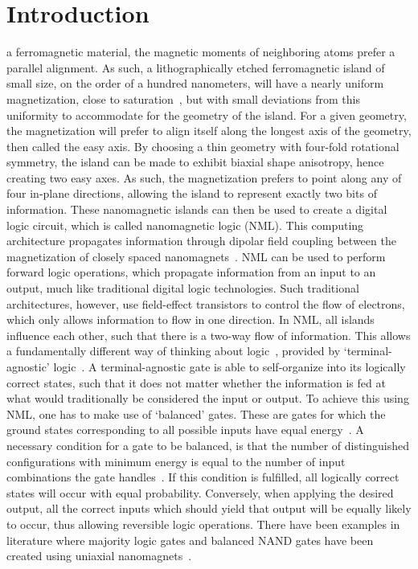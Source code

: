 \documentclass[twocolumn]{phdsymp}
\begin{document}
\section{Introduction}
 a ferromagnetic material, the magnetic moments of neighboring atoms prefer a parallel alignment. As such, a lithographically etched ferromagnetic island of small size, on the order of a hundred nanometers, will have a nearly uniform magnetization, close to saturation~\cite{NML_Carlton,MQCA_RoomTemp,MuMax3_advances}, but with small deviations from this uniformity to accommodate for the geometry of the island. For a given geometry, the magnetization will prefer to align itself along the longest axis of the geometry, then called the easy axis. By choosing a thin geometry with four-fold rotational symmetry, the island can be made to exhibit biaxial shape anisotropy, hence creating two easy axes. As such, the magnetization prefers to point along any of four in-plane directions, allowing the island to represent exactly two bits of information. These nanomagnetic islands can then be used to create a digital logic circuit, which is called nanomagnetic logic (NML). This computing architecture propagates information through dipolar field coupling between the magnetization of closely spaced nanomagnets~\cite{SubnanosecondPropagation_AnisotropyChains}. NML can be used to perform forward logic operations, which propagate information from an input to an output, much like traditional digital logic technologies. Such traditional architectures, however, use field-effect transistors to control the flow of electrons, which only allows information to flow in one direction. In NML, all islands influence each other, such that there is a two-way flow of information. This allows a fundamentally different way of thinking about logic~\cite{gypens2020nanomagnetic}, provided by `terminal-agnostic' logic~\cite{FactorizationMemcomputing}. A terminal-agnostic gate is able to self-organize into its logically correct states, such that it does not matter whether the information is fed at what would traditionally be considered the input or output. To achieve this using NML, one has to make use of `balanced' gates. These are gates for which the ground states corresponding to all possible inputs have equal energy~\cite{GYP-18}. A necessary condition for a gate to be balanced, is that the number of distinguished configurations with minimum energy is equal to the number of input combinations the gate handles~\cite{QCA_Algorithms}. If this condition is fulfilled, all logically correct states will occur with equal probability. Conversely, when applying the desired output, all the correct inputs which should yield that output will be equally likely to occur, thus allowing reversible logic operations. There have been examples in literature where majority logic gates and balanced NAND gates have been created using uniaxial nanomagnets~\cite{GYP-18}. \par
\end{document}
